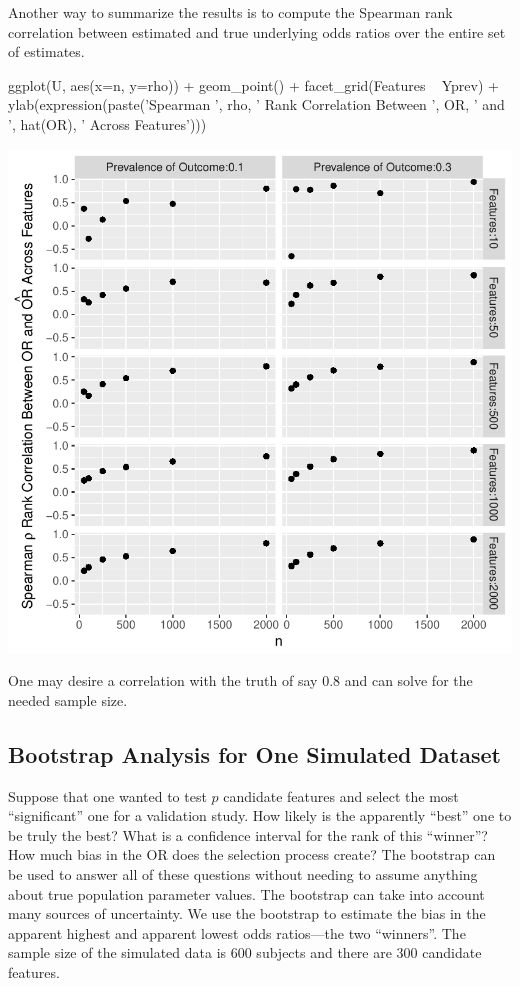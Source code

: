 Another way to summarize the results is to compute the Spearman rank correlation
between estimated and true underlying odds ratios over the entire set of 
estimates.
\begin{Schunk}
\begin{Sinput}
ggplot(U, aes(x=n, y=rho)) + geom_point() +
  facet_grid(Features ~ Yprev) +
  ylab(expression(paste('Spearman ', rho, ' Rank Correlation Between ',
                        OR, ' and ', hat(OR), ' Across Features')))
\end{Sinput}


\centerline{\includegraphics[width=\maxwidth]{hdata-simor-rho-1} }

\end{Schunk}
One may desire a correlation with the truth of say 0.8 and can solve
for the needed sample size.

\subsection{Bootstrap Analysis for One Simulated Dataset}
Suppose that one wanted to test $p$ candidate features and select the
most ``significant'' one for a validation study.  How likely is the
apparently ``best'' one to be truly the best?  What is a confidence
interval for the rank of this ``winner''?  How much bias in the OR
does the selection process create?  The bootstrap can be used to
answer all of these questions without needing to assume anything about
true population parameter values.  The bootstrap can take into account
many sources of uncertainty.  We use the bootstrap to estimate the
bias in the apparent highest and apparent lowest odds ratios---the two
``winners''.  The sample size of the simulated data is 600 subjects
and there are 300 candidate features.

